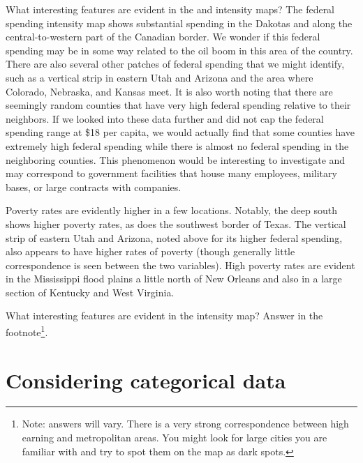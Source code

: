 \begin{example}{What interesting features are evident in the  and  intensity maps?}
The federal spending intensity map shows substantial spending in the Dakotas and along the central-to-western part of the Canadian border. We wonder if this federal spending may be in some way related to the oil boom in this area of the country. There are also several other patches of federal spending that we might identify, such as a vertical strip in eastern Utah and Arizona and the area where Colorado, Nebraska, and Kansas meet. It is also worth noting that there are seemingly random counties that have very high federal spending relative to their neighbors. If we looked into these data further and did not cap the federal spending range at \$18 per capita, we would actually find that some counties have extremely high federal spending while there is almost no federal spending in the neighboring counties. This phenomenon would be interesting to investigate and may correspond to government facilities that house many employees, military bases, or large contracts with companies.

Poverty rates are evidently higher in a few locations. Notably, the deep south shows higher poverty rates, as does the southwest border of Texas. The vertical strip of eastern Utah and Arizona, noted above for its higher federal spending, also appears to have higher rates of poverty (though generally little correspondence is seen between the two variables).  High poverty rates are evident in the Mississippi flood plains a little north of New Orleans and also in a large section of Kentucky and West Virginia.
\end{example}

\begin{exercise}
What interesting features are evident in the  intensity map? Answer in the footnote\footnote{Note: answers will vary. There is a very strong correspondence between high earning and metropolitan areas. You might look for large cities you are familiar with and try to spot them on the map as dark spots.}.
\end{exercise}



\section{Considering categorical data}
\label{categoricalData}

